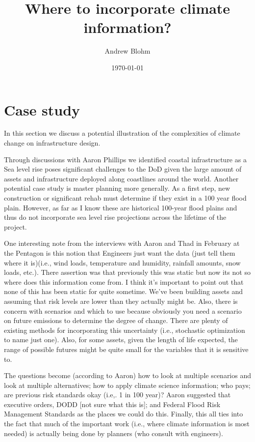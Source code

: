 \documentclass[10pt]{amsart}
\title{Where to incorporate climate information?}
\author{Andrew Blohm}
\date{\today}
\begin{document}
\maketitle
\section{Case study}
In this section we discuss a potential illustration of the complexities of climate change on infrastructure design.

Through discussions with Aaron Phillips we identified coastal infrastructure as a 
Sea level rise poses significant challenges to the DoD given the large amount of assets and infrastructure deployed along coastlines around the world. 
Another potential case study is master planning more generally.
As a first step, new construction or significant rehab must determine if they exist in a 100 year flood plain.
However, as far as I know these are historical 100-year flood plains and thus do not incorporate sea level rise projections across the lifetime of the project.

One interesting note from the interviews with Aaron and Thad in February at the Pentagon is this notion that Engineers just want the data (just tell them where it is)(i.e., wind loads, temperature and humidity, rainfall amounts, snow loads, etc.).
There assertion was that previously this was static but now its not so where does this information come from.
I think it's important to point out that none of this has been static for quite sometime.
We've been building assets and assuming that risk levels are lower than they actually might be.
Also, there is concern with scenarios and which to use because obviously you need a scenario on future emissions to determine the degree of change.
There are plenty of existing methods for incorporating this uncertainty (i.e., stochastic optimization to name just one). 
Also, for some assets, given the length of life expected, the range of possible futures might be quite small for the variables that it is sensitive to.

The questions become (according to Aaron) how to look at multiple scenarios and look at multiple alternatives; how to apply climate science information; who pays; are previous risk standards okay (i.e,. 1 in 100 year)?
Aaron suggested that executive orders, DODD [not sure what this is]; and Federal Flood Risk Management Standards as the places we could do this.
Finally, this all ties into the fact that much of the important work (i.e., where climate information is most needed) is actually being done by planners (who consult with engineers).
\end{document}
